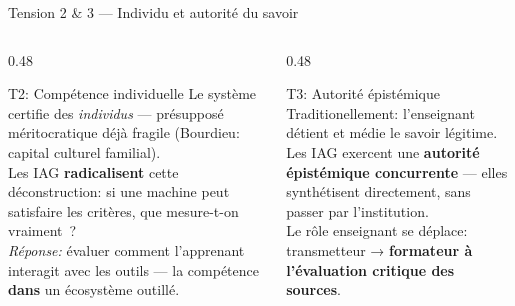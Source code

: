 \begin{frame}{Tension 2 \& 3 --- Individu et autorité du savoir}
  \begin{columns}[T]
    \begin{column}{0.48\textwidth}
      \begin{block}{T2: Compétence individuelle}
        Le système certifie des \emph{individus} ---
        présupposé méritocratique déjà fragile
        (Bourdieu: capital culturel familial).\\[0.4em]
        Les IAG \textbf{radicalisent} cette déconstruction:
        si une machine peut satisfaire les critères,
        que mesure-t-on vraiment~?\\[0.4em]
        \emph{Réponse:} évaluer comment l'apprenant
        interagit avec les outils --- la compétence
        \textbf{dans} un écosystème outillé.
      \end{block}
    \end{column}
    \begin{column}{0.48\textwidth}
      \begin{block}{T3: Autorité épistémique}
        Traditionellement: l'enseignant détient
        et médie le savoir légitime.\\[0.4em]
        Les IAG exercent une \textbf{autorité
        épistémique concurrente} --- elles synthétisent
        directement, sans passer par l'institution.\\[0.4em]
        Le rôle enseignant se déplace:
        transmetteur → \textbf{formateur à l'évaluation
        critique des sources}.
      \end{block}
    \end{column}
  \end{columns}
\end{frame}

